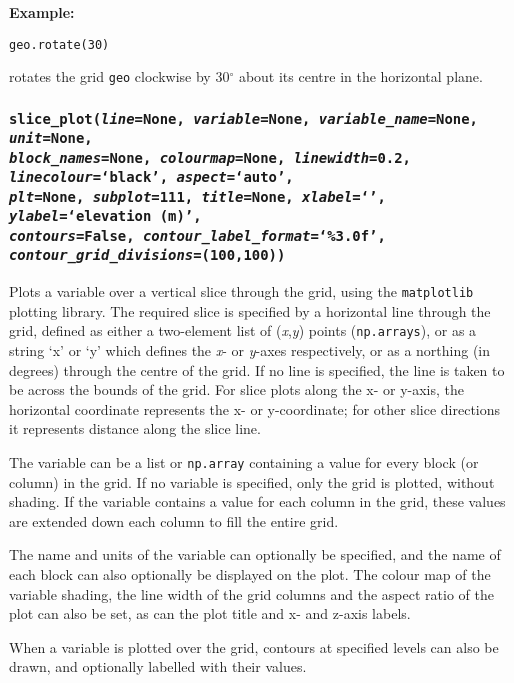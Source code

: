 \textbf{Example:}

\begin{verbatim}
geo.rotate(30)
\end{verbatim}

rotates the grid \texttt{geo} clockwise by 30$^{\circ}$ about its centre in the horizontal plane.

\subsubsection{\texttt{slice\_plot(\emph{line}=None, \emph{variable}=None, \emph{variable\_name}=None, \emph{unit}=None,\\
    \emph{block\_names}=None, \emph{colourmap}=None, \emph{linewidth}=0.2, \emph{linecolour}=`black', \emph{aspect}=`auto',\\
    \emph{plt}=None, \emph{subplot}=111, \emph{title}=None, \emph{xlabel}=`', \emph{ylabel}=`elevation (m)',\\
    \emph{contours}=False, \emph{contour\_label\_format}=`\%3.0f', \emph{contour\_grid\_divisions}=(100,100))}}

Plots a variable over a vertical slice through the grid, using the \texttt{matplotlib} plotting library.  The required slice is specified by a horizontal line through the grid, defined as either a two-element list of (\emph{x},\emph{y}) points (\texttt{np.arrays}), or as a string `x' or `y' which defines the \emph{x}- or \emph{y}-axes respectively, or as a northing (in degrees) through the centre of the grid.  If no line is specified, the line is taken to be across the bounds of the grid.  For slice plots along the x- or y-axis, the horizontal coordinate represents the x- or y-coordinate; for other slice directions it represents distance along the slice line.

The variable can be a list or \texttt{np.array} containing a value for every block (or column) in the grid.  If no variable is specified, only the grid is plotted, without shading.  If the variable contains a value for each column in the grid, these values are extended down each column to fill the entire grid.

The name and units of the variable can optionally be specified, and the name of each block can also optionally be displayed on the plot.  The colour map of the variable shading, the line width of the grid columns and the aspect ratio of the plot can also be set, as can the plot title and x- and z-axis labels.

When a variable is plotted over the grid, contours at specified levels can also be drawn, and optionally labelled with their values.

